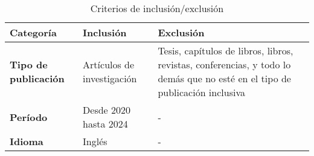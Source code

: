 \begin{table}[htbp]
	\centering
	\caption{Criterios de inclusión/exclusión}
	\label{table:inclusion_exclusion_criteria}
	\renewcommand{\arraystretch}{1}  %
	\begin{tabular}{p{1.5cm}p{2.2cm}p{2.8cm}}
		\toprule
		\textbf{Categoría}           & \textbf{Inclusión}         & \textbf{Exclusión}                                                                                                          \\
		\midrule
		\textbf{Tipo de publicación} & Artículos de investigación & Tesis, capítulos de libros, libros, revistas, conferencias, y todo lo demás que no esté en el tipo de publicación inclusiva \\
		\addlinespace[0.8em]
		\textbf{Período}             & Desde 2020 hasta 2024      & -                                                                                                                           \\
		\addlinespace[0.8em]
		\textbf{Idioma}              & Inglés                     & -                                                                                                                           \\
		\bottomrule
	\end{tabular}
\end{table}

